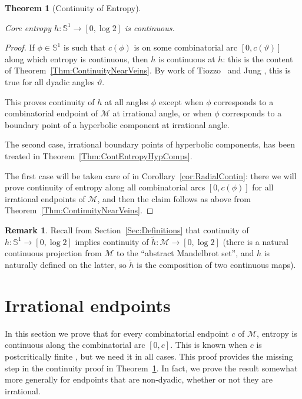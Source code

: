 \documentclass[12pt]{amsart}
\newcommand{\M}{\mathscr M}
\newcommand{\Circle}{\mathbb S^1}
\newcommand{\0}{\texttt{0}}
\newcommand{\1}{\texttt{1}}
\newtheorem{theorem}{Theorem}[section]
\theoremstyle{definition}
\newtheorem*{remark}{Remark}
\numberwithin{equation}{section}
\renewcommand{\theta}{\vartheta}
\newcommand{\lineclear}{\rule{0pt}{2pt}\newline}
\newcounter{reminder}[section]
\newcounter{treminder}
\newcommand{\reminder}[1]{\stepcounter{reminder}\stepcounter{treminder}$\rhd$\textsl{#1}$\lhd$\marginpar{\thesection.\arabic{reminder}$\lhd\rhd\lhd\rhd\lhd\rhd$}}
\renewcommand{\reminder}[1]{}
\begin{document}
\begin{theorem}[Continuity of Entropy]
\label{Thm:Continuity} \lineclear
Core entropy $h\colon\Circle\to[0,\log 2]$ is continuous.
\end{theorem}
\begin{proof}
If $\phi\in\Circle$ is such that $c(\phi)$ is on some combinatorial arc $[0,c(\theta)]$ along which entropy is continuous, then $h$ is continuous at $h$: this is the content of Theorem~\ref{Thm:ContinuityNearVeins}. By work of Tiozzo~\cite{TiozzoThesis} and Jung \cite[Theorem~4.9]{Jung}, this is true for all dyadic angles $\theta$. 

This proves continuity of $h$ at all angles $\phi$ except when $\phi$ corresponds to a combinatorial endpoint of $\M$ at irrational angle, or when $\phi$ corresponds to a boundary point of a hyperbolic component at irrational angle. 

The second case, irrational boundary points of hyperbolic components, has been treated in Theorem~\ref{Thm:ContEntropyHypComps}.

The first case will be taken care of in Corollary~\ref{cor:RadialContin}: there we will prove continuity of entropy along all combinatorial arcs $[0,c(\phi)]$ for all irrational endpoints of $\M$, and then the claim follows as above from Theorem~\ref{Thm:ContinuityNearVeins}. 
\end{proof}

\begin{remark}
Recall from Section~\ref{Sec:Definitions} that continuity of $h\colon\Circle\to[0,\log 2]$ implies continuity of $\tilde h\colon\M\to[0,\log 2]$ (there is a natural continuous projection from $\M$ to the ``abstract Mandelbrot set'', and $h$ is naturally defined on the latter, so $\tilde h$ is the composition of two continuous maps).
\end{remark}



\reminder{Current number of reminders: \arabic{treminder}}





\section{Irrational endpoints}
\label{Sec:IrratEndpoints}

In this section we prove that for every combinatorial endpoint $c$ of $\M$, entropy is continuous along the combinatorial arc $[0,c]$. This is known when $c$ is postcritically finite \cite[Theorem~4.9]{Jung}, but we need it in all cases. This proof provides the missing step in the continuity proof in Theorem~\ref{Thm:Continuity}. {In fact, we prove the result somewhat more generally for endpoints that are non-dyadic, whether or not they are irrational.}
\end{document}
